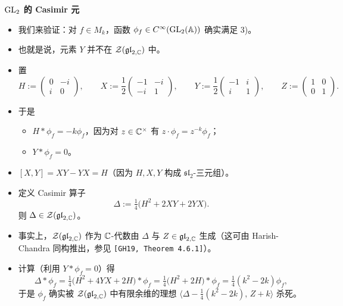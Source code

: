\medskip
\noindent\textbf{$\operatorname{GL}_2$ 的 Casimir 元}
\begin{itemize}
\item 我们来验证：对 $f\in M_k$，函数 $\phi_f\in C^\infty(\operatorname{GL}_2(\mathbb{A}))$ 确实满足 3)。
\item 也就是说，元素 $Y$ 并不在 $\mathcal{Z}(\mathfrak{gl}_{2,\mathbb{C}})$ 中。
\item 置
\[
H:=\begin{pmatrix}0&-i\\ i&0\end{pmatrix},\qquad
X:=\frac12\begin{pmatrix}-1&-i\\ -i&1\end{pmatrix},\qquad
Y:=\frac12\begin{pmatrix}-1&i\\ i&1\end{pmatrix},\qquad
Z:=\begin{pmatrix}1&0\\ 0&1\end{pmatrix}.
\]
\item 于是
\begin{itemize}
\item[1)] $H*\phi_f=-k\phi_f$，因为对 $z\in\mathbb{C}^\times$ 有 $z\cdot\phi_f=z^{-k}\phi_f$；
\item[2)] $Y*\phi_f=0$。
\end{itemize}
\item $[X,Y]=XY-YX=H$（因为 $H,X,Y$ 构成 $\mathfrak{sl}_2$-三元组）。
\item 定义 Casimir 算子
\begin{equation}\tag{1}\label{eq:11.1}
\Delta:=\tfrac14\bigl(H^2+2XY+2YX\bigr).
\end{equation}
则 $\Delta\in\mathcal{Z}(\mathfrak{gl}_{2,\mathbb{C}})$。
\item 事实上，$\mathcal{Z}(\mathfrak{gl}_{2,\mathbb{C}})$ 作为 $\mathbb{C}$-代数由 $\Delta$ 与 $Z\in\mathfrak{gl}_{2,\mathbb{C}}$ 生成（这可由 Harish-Chandra 同构推出，参见 \texttt{[GH19, Theorem 4.6.1]}）。
\item 计算（利用 $Y*\phi_f=0$）得
\begin{equation}\tag{2}\label{eq:11.2}
\Delta*\phi_f=\tfrac14\bigl(H^2+4YX+2H\bigr)*\phi_f=\tfrac14\bigl(H^2+2H\bigr)*\phi_f=\tfrac14(k^2-2k)\phi_f,
\end{equation}
于是 $\phi_f$ 确实被 $\mathcal{Z}(\mathfrak{gl}_{2,\mathbb{C}})$ 中有限余维的理想 $\bigl\langle\Delta-\tfrac14(k^2-2k),\,Z+k\bigr\rangle$ 杀死。
\end{itemize}

